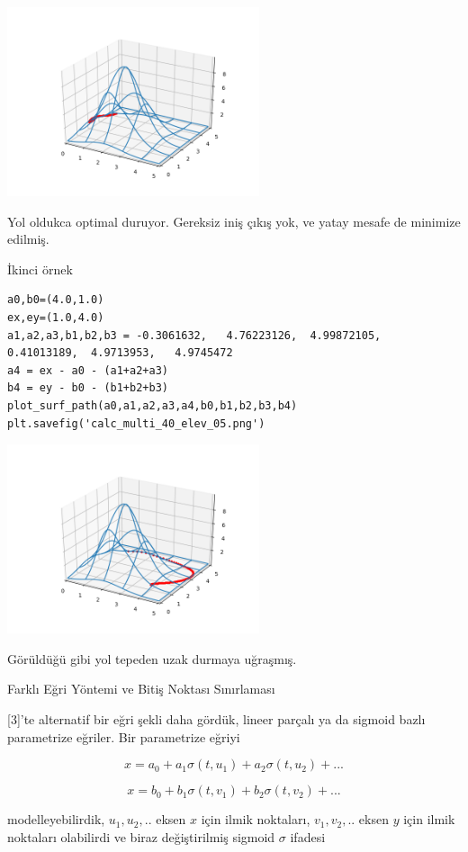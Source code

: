 \documentclass[12pt,fleqn]{article}\usepackage{../../common}
\begin{document}
\includegraphics[width=20em]{calc_multi_40_elev_04.png}

Yol oldukca optimal duruyor. Gereksiz iniş çıkış yok, ve yatay mesafe de
minimize edilmiş. 

İkinci örnek 

\begin{verbatim}
a0,b0=(4.0,1.0)
ex,ey=(1.0,4.0)
a1,a2,a3,b1,b2,b3 = -0.3061632,   4.76223126,  4.99872105,  0.41013189,  4.9713953,   4.9745472 
a4 = ex - a0 - (a1+a2+a3)
b4 = ey - b0 - (b1+b2+b3)
plot_surf_path(a0,a1,a2,a3,a4,b0,b1,b2,b3,b4)
plt.savefig('calc_multi_40_elev_05.png')
\end{verbatim}

\includegraphics[width=20em]{calc_multi_40_elev_05.png}

Görüldüğü gibi yol tepeden uzak durmaya uğraşmış.

Farklı Eğri Yöntemi ve Bitiş Noktası Sınırlaması

[3]'te alternatif bir eğri şekli daha gördük, lineer parçalı ya da sigmoid
bazlı parametrize eğriler. Bir parametrize eğriyi 

$$
x = a_0 + a_1 \sigma(t,u_1) + a_2 \sigma(t,u_2) + ... 
$$

$$
x = b_0 + b_1 \sigma(t,v_1) + b_2 \sigma(t,v_2) + ... 
$$

modelleyebilirdik, $u_1,u_2,..$ eksen $x$ için ilmik noktaları,
$v_1,v_2,..$ eksen $y$ için ilmik noktaları olabilirdi ve biraz
değiştirilmiş sigmoid $\sigma$ ifadesi
\end{document}
